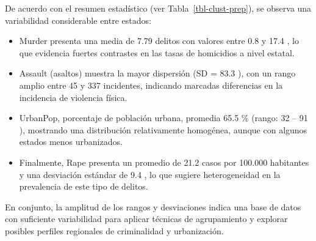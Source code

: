 \documentclass[
  spanish,
  11pt,
  a4paper,
  DIV=11,
  numbers=noendperiod]{scrartcl}
\newenvironment{Shaded}{\begin{snugshade}}{\end{snugshade}}
\newcommand{\AttributeTok}[1]{\textcolor[rgb]{0.40,0.45,0.13}{#1}}
\newcommand{\CommentTok}[1]{\textcolor[rgb]{0.37,0.37,0.37}{#1}}
\newcommand{\ConstantTok}[1]{\textcolor[rgb]{0.56,0.35,0.01}{#1}}
\newcommand{\DecValTok}[1]{\textcolor[rgb]{0.68,0.00,0.00}{#1}}
\newcommand{\FunctionTok}[1]{\textcolor[rgb]{0.28,0.35,0.67}{#1}}
\newcommand{\NormalTok}[1]{\textcolor[rgb]{0.00,0.23,0.31}{#1}}
\newcommand{\OtherTok}[1]{\textcolor[rgb]{0.00,0.23,0.31}{#1}}
\newcommand{\SpecialCharTok}[1]{\textcolor[rgb]{0.37,0.37,0.37}{#1}}
\newcommand{\StringTok}[1]{\textcolor[rgb]{0.13,0.47,0.30}{#1}}
\begin{document}
De acuerdo con el resumen estadístico (ver Tabla~\ref{tbl-clust-prep}),
se observa una variabilidad considerable entre estados:

\begin{itemize}
\item
  Murder presenta una media de 7.79 delitos con valores entre 0.8 y 17.4
  , lo que evidencia fuertes contrastes en las tasas de homicidios a
  nivel estatal.
\item
  Assault (asaltos) muestra la mayor dispersión (SD = 83.3 ), con un
  rango amplio entre 45 y 337 incidentes, indicando marcadas diferencias
  en la incidencia de violencia física.
\item
  UrbanPop, porcentaje de población urbana, promedia 65.5 \% (rango: 32
  -- 91 ), mostrando una distribución relativamente homogénea, aunque
  con algunos estados menos urbanizados.
\item
  Finalmente, Rape presenta un promedio de 21.2 casos por 100.000
  habitantes y una desviación estándar de 9.4 , lo que sugiere
  heterogeneidad en la prevalencia de este tipo de delitos.
\end{itemize}

En conjunto, la amplitud de los rangos y desviaciones indica una base de
datos con suficiente variabilidad para aplicar técnicas de agrupamiento
y explorar posibles perfiles regionales de criminalidad y urbanización.

\begin{Shaded}
\end{Shaded}
\end{document}
